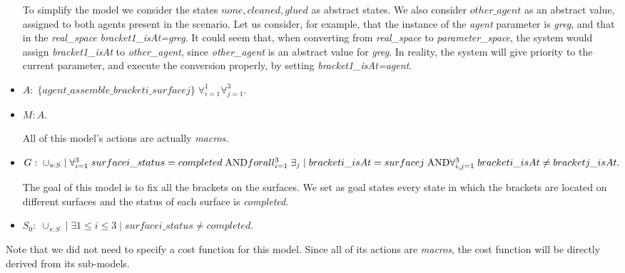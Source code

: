 \begin{itemize}
		To simplify the model we consider the states $none,cleaned,glued$ as abstract states. We also consider $other\_agent$ as an abstract value, assigned to both agents present in the scenario. Let us consider, for example, that the instance of the \textit{agent} parameter is \textit{greg}, and that in the \textit{real\_space} \textit{bracket1\_isAt=greg}. It could seem that, when converting from \textit{real\_space} to \textit{parameter\_space}, the system would assign \textit{bracket1\_isAt} to \textit{other\_agent}, since \textit{other\_agent} is an abstract value for \textit{greg}. In reality, the system will give priority to the current parameter, and execute the conversion properly, by setting \textit{bracket1\_isAt=agent}. 
	\item $A:\;\{agent\_assemble\_bracketi\_surfacej\}\;\forall_{i=1}^1 \forall_{j=1}^3$.
	\item $M: A$.

	All of this model's actions are actually \textit{macros}.
	\item $G:\; \cup_{s:S}\; |\; \forall_{i=1}^3\; surfacei\_status=completed\;\text{AND}\;\\
	forall_{i=1}^3\;\exists_{j}\;|\;bracketi\_isAt=surfacej\; \text{AND} \\
	\forall_{i,j=1}^3\; bracketi\_isAt \neq bracketj\_isAt.$

	The goal of this model is to fix all the brackets on the surfaces. We set as goal states every state in which the brackets are located on different surfaces and the status of each surface is \textit{completed}. 
	\item $S_0:\; \cup_{s:S}\;|\; \exists{1\leq i \leq 3}\; |\; surfacei\_status \neq completed$.

\end{itemize}

Note that we did not need to specify a cost function for this model. Since all of its actions are \textit{macros}, the cost function will be directly derived from its sub-models.

